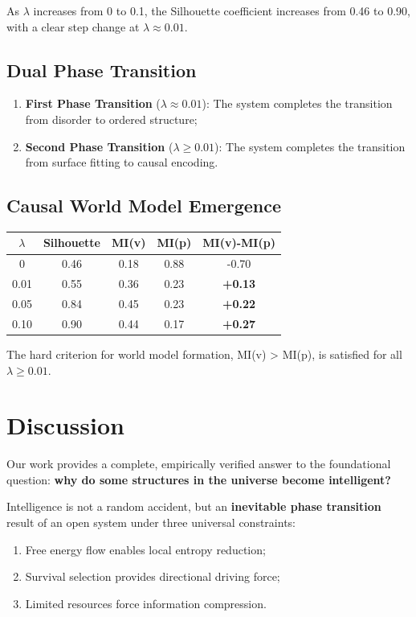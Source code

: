\documentclass[11pt]{article}
\begin{document}
As $\lambda$ increases from 0 to 0.1, the Silhouette coefficient increases from 0.46 to 0.90, with a clear step change at $\lambda \approx 0.01$.

\subsection{Dual Phase Transition}

\begin{enumerate}
    \item \textbf{First Phase Transition} ($\lambda \approx 0.01$): The system completes the transition from disorder to ordered structure;
    \item \textbf{Second Phase Transition} ($\lambda \geq 0.01$): The system completes the transition from surface fitting to causal encoding.
\end{enumerate}

\subsection{Causal World Model Emergence}

\begin{table}[h]
\centering
\begin{tabular}{|c|c|c|c|c|}
\hline
$\lambda$ & Silhouette & MI(v) & MI(p) & MI(v)-MI(p) \\
\hline
0 & 0.46 & 0.18 & 0.88 & -0.70 \\
0.01 & 0.55 & 0.36 & 0.23 & \textbf{+0.13} \\
0.05 & 0.84 & 0.45 & 0.23 & \textbf{+0.22} \\
0.10 & 0.90 & 0.44 & 0.17 & \textbf{+0.27} \\
\hline
\end{tabular}
\end{table}

The hard criterion for world model formation, MI(v) > MI(p), is satisfied for all $\lambda \geq 0.01$.

\section{Discussion}

Our work provides a complete, empirically verified answer to the foundational question: \textbf{why do some structures in the universe become intelligent?}

Intelligence is not a random accident, but an \textbf{inevitable phase transition} result of an open system under three universal constraints:
\begin{enumerate}
    \item Free energy flow enables local entropy reduction;
    \item Survival selection provides directional driving force;
    \item Limited resources force information compression.
\end{enumerate}
\end{document}
